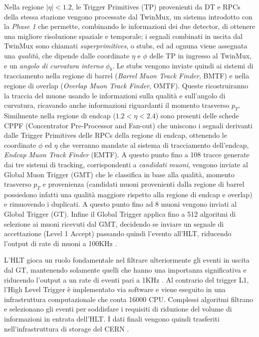 Nella regione $|\eta| < 1.2$, le Trigger Primitives (TP) provenienti da DT e RPCs della stessa stazione vengono processate dal TwinMux, un sistema introdotto con la \textit{Phase 1} che permette, combinando le informazioni dei due detector, di ottenere una migliore risoluzione spaziale e temporale; i segnali combinati in uscita dal TwinMux sono chiamati \textit{superprimitives}, o stubs, ed ad ognuna viene assegnata una \textit{qualità}, che dipende dalle coordinate $\eta$ e $\phi$ delle TP in ingresso al TwinMux, e un \textit{angolo di curvatura interno} $\phi_b$. Le stubs vengono inviate quindi ai sistemi di tracciamento nella regione di barrel (\textit{Barrel Muon Track Finder}, BMTF) e nella regione di overlap (\textit{Overlap Muon Track Finder}, OMTF). Queste  ricostruiranno la traccia del muone usando le informazioni sulla qualità e sull'angolo di curvatura, ricavando anche informazioni riguardanti il momento trasverso $p_T$. \newline
Similmente nella regione di endcap ($1.2 < \eta < 2.4$) sono presenti delle schede CPPF (Concentrator Pre-Processor and Fan-out) che uniscono i segnali derivanti dalle Trigger Primitives delle RPCs della regione di endcap, ottenendo le coordinate $\phi$ ed $\eta$ che verranno mandate al sistema di tracciamento dell'endcap, \textit{Endcap Muon Track Finder} (EMTF). \newline
A questo punto fino a 108 tracce generate dai tre sistemi di tracking, corrispondenti a \textit{candidati muoni}, vengono inviate al Global Muon Trigger (GMT) che le classifica in base alla qualità, momento trasverso $p_T$ e provenienza (candidati muoni provenienti dalla regione di barrel possiedono infatti una qualità maggiore rispetto alla regione di endcap e overlap) e rimuovendo i duplicati. A questo punto fino ad 8 muoni vengono inviati al Global Trigger (GT). \newline
Infine il Global Trigger applica fino a 512 algoritmi di selezione ai muoni ricevuti dal GMT, decidendo se inviare un segnale di accettazione (Level 1 Accept) passando quindi l'evento all'HLT, riducendo l'output di rate di muoni a 100KHz \cite{CERNsummerSchool}.

L'HLT gioca un ruolo fondamentale nel filtrare ulteriormente gli eventi in uscita dal GT, mantenendo solamente quelli che hanno una importanza significativa e riducendo l'output a un rate di eventi pari a 1KHz . Al contrario del trigger L1, l'High Level Trigger è implementato via software e viene eseguito in una infrastruttura computazionale che conta 16000 CPU. \newline
Complessi algoritmi filtrano e selezionano gli eventi per soddisfare i requisiti di riduzione del volume di informazioni in entrata dell'HLT. I dati finali vengono quindi trasferiti nell'infrastruttura di storage del CERN \cite{MasterThesisNicLai}.



